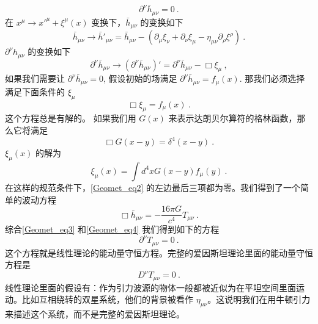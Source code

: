 \begin{equation}\label{Geomet_eq3}
\partial^\nu \bar h_{\mu\nu} = 0 ~. 
\end{equation}
在 $x^\mu\rightarrow x'^\mu+\xi^\mu(x)$ 变换下，$\bar h_{\mu\nu}$ 的变换如下
\begin{equation}
\bar h_{\mu\nu} \rightarrow \bar h'_{\mu\nu} = \bar h_{\mu\nu} - (\partial_\mu\xi_\nu+ \partial_\nu\xi_\mu - \eta_{\mu\nu} \partial_\rho\xi^\rho )~. 
\end{equation}
$\partial^\nu h_{\mu\nu}$ 的变换如下
\begin{equation}
\partial^\nu \bar h_{\mu\nu} \rightarrow (\partial^\nu \bar h_{\mu\nu})' = \partial^\nu \bar h_{\mu\nu} - \Box \xi_\mu ~, 
\end{equation}
如果我们需要让 $\partial^\nu \bar h_{\mu\nu} = 0$, 假设初始的场满足 $\partial^\nu \bar h_{\mu\nu} = f_\mu (x)$. 那我们必须选择满足下面条件的 $\xi_\mu$
\begin{equation}
\Box \xi_\mu = f_\mu (x) ~. 
\end{equation}
这个方程总是有解的。 如果我们用 $G(x)$ 来表示达朗贝尔算符的格林函数，那么它将满足
\begin{equation}
\Box G(x-y) = \delta^4 (x-y) ~.
\end{equation}
$\xi_\mu(x)$ 的解为
\begin{equation}
\xi_\mu(x) = \int d^4 x G(x-y) f_\mu(y) ~.
\end{equation}
在这样的规范条件下，\autoref{Geomet_eq2} 的左边最后三项都为零。我们得到了一个简单的波动方程
\begin{equation}\label{Geomet_eq4}
\Box \bar h_{\mu\nu} = - \frac{16\pi G}{c^4} T_{\mu\nu} ~. 
\end{equation}
综合\autoref{Geomet_eq3} 和\autoref{Geomet_eq4} 我们得到如下的方程
\begin{equation}
\partial^\nu T_{\mu\nu} = 0~.
\end{equation}
这个方程就是线性理论的能动量守恒方程。完整的爱因斯坦理论里面的能动量守恒方程是
\begin{equation}
D^\nu T_{\mu\nu} = 0 ~.
\end{equation}
线性理论里面的假设有：作为引力波源的物体一般都被近似为在平坦空间里面运动。比如互相绕转的双星系统，他们的背景被看作 $\eta_{\mu\nu}$。这说明我们在用牛顿引力来描述这个系统，而不是完整的爱因斯坦理论。
